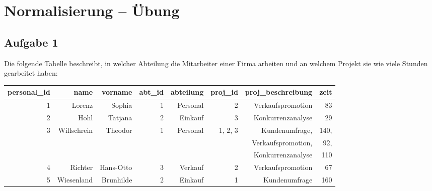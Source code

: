 \clearpage

\rehead[]{\textcolor{lightblue}{AvHG, Inf, My}}
\lohead[]{\textcolor{lightblue}{AvHG, Inf, My}}

\section{Normalisierung -- Übung}

\subsection{Aufgabe 1}

Die folgende Tabelle beschreibt, in welcher Abteilung die Mitarbeiter einer Firma
arbeiten und an welchem Projekt sie wie viele Stunden gearbeitet haben:

\begin{tabular}{|r|r|r|r|r|r|r|r|}\hline
\textbf{personal\_id} & \textbf{name} & \textbf{vorname} & \textbf{abt\_id} &
\textbf{abteilung} & \textbf{proj\_id} & \textbf{proj\_beschreibung} &
\textbf{zeit}
\\ \hline
1 & Lorenz & Sophia & 1 & Personal & 2 & Verkaufspromotion & 83
\\ \hline 
2 & Hohl & Tatjana & 2 & Einkauf & 3 & Konkurrenzanalyse & 29
\\ \hline
3 & Willschrein & Theodor & 1 & Personal & 1, 2, 3 & Kundenumfrage, & 140,
\\
 & & & & & & Verkaufspromotion, & 92,
\\
 & & & & & & Konkurrenzanalyse & 110
\\ \hline
4 & Richter & Hans-Otto & 3 & Verkauf & 2 & Verkaufspromotion & 67
\\ \hline
5 & Wiesenland & Brunhilde & 2 & Einkauf & 1 & Kundenumfrage & 160
\\ \hline
\end{tabular}

